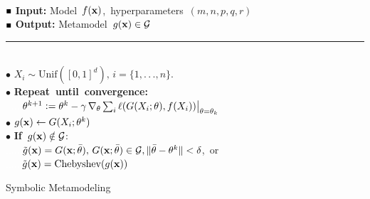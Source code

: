\documentclass [PhD] {uclathes}
\newcommand{\defeq}{\vcentcolon=}
\begin{document}
\begin{algorithm}[H]
        $ $\\[.5ex]
        $\mbox{\tiny $\blacksquare$}$ \mbox{\footnotesize {\bf Input:}} \mbox{\footnotesize Model $f({\bf x})$, hyperparameters $(m,n,p,q,r)$} \\[1ex]
        $\mbox{\tiny $\blacksquare$}$ \mbox{\footnotesize {\bf Output:}} \mbox{\footnotesize Metamodel $g({\bf x}) \in \mathcal{G}$} \vspace{0.1in} \hrule
        $ $\\[.5ex]  
        $\mbox{$\bullet$}$ \mbox{\footnotesize$X_i \sim \mbox{Unif}([0,1]^d),\, i = \{1,.\,.\,.,n\}$.} \\[1ex] %
$\mbox{$\bullet$}$ \mbox{\footnotesize {\bf Repeat until convergence:}} \\[1ex]
\textcolor{white}{$ .$$ .$$ .$$ .$$ .$$ .$}\mbox{\footnotesize $\theta^{k+1} \defeq \theta^{k} - \gamma\,\nabla_{\theta}\sum_i\ell(G(X_i;\theta), f(X_i))\big|_{\theta = \theta_k}$} \\ %
$\mbox{$\bullet$}$  \mbox{\footnotesize $g({\bf x}) \gets G(X_i;\theta^{k})$} \\ [1ex]        
$\mbox{$\bullet$}$ \mbox{\footnotesize {\bf If} $g({\bf x}) \notin \mathcal{G}$:} \\[1ex]
\textcolor{white}{$ .$$ .$$ .$$ .$$ .$$ .$}\mbox{\footnotesize $\tilde{g}({\bf x}) = G({\bf x};\bar{\theta}),\, G({\bf x};\bar{\theta}) \in \mathcal{G}, \|\bar{\theta}-\theta^k\|  < \delta$, or} \\
\textcolor{white}{$ .$$ .$$ .$$ .$$ .$$ .$}\mbox{\footnotesize $\tilde{g}({\bf x}) = \mbox{Chebyshev}(g({\bf x}))$}\vspace{0.05in} %
        \caption{Symbolic Metamodeling}
        \end{algorithm}
\end{document}
